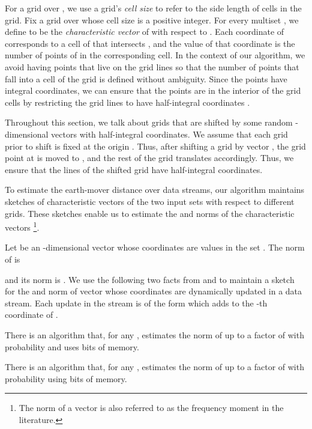 \documentclass[oribibl]{llncs}
\begin{document}
For a grid over , we use a grid's \textit{cell size}
to refer to the side length of cells in the grid.
Fix a grid 
over  whose cell size is a positive integer. For every
multiset , we define  to be the
\textit{characteristic vector} of  with respect to . Each coordinate of
 corresponds to a cell of  that intersects , and the
value of that coordinate is the number of points of  in the corresponding 
cell.
In the context of our algorithm, we avoid having points that live on the grid 
lines so that the number of points that fall into a cell of the grid is
defined without ambiguity. Since the points have integral coordinates,
we can ensure that the points are in the interior of the grid cells
by restricting the grid lines to have
half-integral coordinates .

Throughout this section, we talk about grids that are shifted by some random
-dimensional vectors with half-integral coordinates. 
We assume that each grid prior to shift is fixed at the origin .
Thus, after shifting a grid by vector , the grid point
at  is moved to , and the rest of the grid translates
accordingly. Thus, we ensure that the lines of the shifted grid have
half-integral coordinates.

To estimate the earth-mover distance over data streams, our algorithm maintains
sketches of characteristic vectors of the two input sets
with respect to different grids. These sketches enable us to estimate
the  and  norms of the characteristic vectors
\footnote{The  norm of a vector is
also referred to as the frequency moment  in the literature.}. 

Let  be an -dimensional vector whose coordinates are values in the set
. 
The  norm of  is 

and its  norm is .
We use the following two facts from \cite{stable} and \cite{bar_yossef}
to maintain a sketch for the  and  norm of vector  whose
coordinates are dynamically updated in a data stream. 
Each update in the stream is of the form  which adds  to the -th
coordinate of .

\begin{fact}\label{fact1}
There is an algorithm that, for any , estimates the
 norm of  up to a factor of  with probability
 and uses 
bits of memory.
\end{fact}

\begin{fact}\label{fact2}
There is an algorithm that, for any , estimates the 
norm of  up to a factor of  with probability 
using  bits of memory.
\end{fact}
\end{document}
